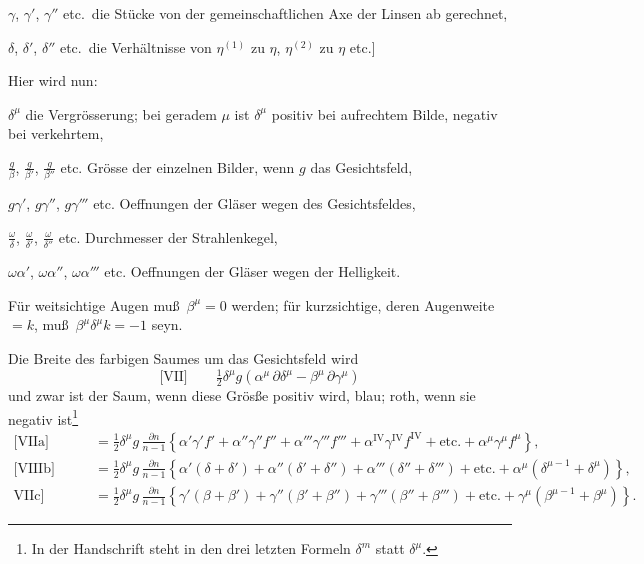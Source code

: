 \documentclass[12pt,a4paper]{article}
\theoremstyle{plain}
\theoremstyle{definition}
\theoremstyle{remark}
\begin{document}
$\gamma$, $\gamma'$, $\gamma''$ etc.\ die St\"ucke von der gemeinschaftlichen
Axe der Linsen ab gerechnet,

$\delta$, $\delta'$, $\delta''$ etc.\ die Verh\"altnisse von $\eta^{(1)}$ zu $\eta$,
$\eta^{(2)}$ zu $\eta$ etc.]

\medskip

Hier wird nun:

\quad $\delta^{\mu}$ die Vergr\"osserung; bei geradem $\mu$ ist
$\delta^{\mu}$ positiv bei aufrechtem Bilde, negativ bei verkehrtem,

\quad $\frac{g}{\beta}$, $\frac{g}{\beta'}$, $\frac{g}{\beta''}$ etc.\qquad
Gr\"osse der einzelnen Bilder, wenn $g$ das Gesichtsfeld,

\quad $g\gamma'$, $g\gamma''$, $g\gamma'''$ etc.\qquad
Oeffnungen der Gl\"aser wegen des Gesichtsfeldes,

\quad $\frac{\omega}{\delta}$, $\frac{\omega}{\delta'}$,
$\frac{\omega}{\delta''}$ etc.\qquad
Durchmesser der Strahlenkegel,

\quad $\omega\alpha'$, $\omega\alpha''$, $\omega\alpha'''$ etc.\qquad
Oeffnungen der Gl\"aser wegen der Helligkeit.

\medskip

F\"ur weitsichtige Augen mu\ss\ $\beta^{\mu} = 0$ werden; f\"ur
kurzsichtige, deren Augenweite $= k$, mu\ss\ $\beta^{\mu}\delta^{\mu}k = -1$
seyn.

Die Breite des farbigen Saumes um das Gesichtsfeld wird
\[
\text{[VII]}\qquad \tfrac{1}{2}\delta^{\mu}g\left(\alpha^{\mu}\,\partial\delta^{\mu}
- \beta^{\mu}\,\partial\gamma^{\mu}\right)
\]
und zwar ist der Saum, wenn diese Gr\"os\ss e positiv wird, blau; roth,
wenn sie negativ ist\footnote{In der Handschrift steht in den drei
letzten Formeln $\delta^{m}$ statt $\delta^{\mu}$.}
\begin{align*}
\text{[VIIa]}\qquad &= \tfrac{1}{2}\delta^{\mu}g\,\frac{\partial n}{n-1}
\left\{\alpha'\gamma'f' + \alpha''\gamma''f'' + \alpha'''\gamma'''f'''
+ \alpha^{\text{IV}}\gamma^{\text{IV}}f^{\text{IV}}
+ \text{etc.} + \alpha^{\mu}\gamma^{\mu}f^{\mu}\right\},\\
\text{[VIIIb]}\qquad &= \tfrac{1}{2}\delta^{\mu}g\,\frac{\partial n}{n-1}
\left\{\alpha'(\delta + \delta') + \alpha''(\delta' + \delta'')
+ \alpha'''(\delta'' + \delta''') + \text{etc.}
+ \alpha^{\mu}(\delta^{\mu-1} + \delta^{\mu})\right\},\\
\text{VIIc]}\qquad &= \tfrac{1}{2}\delta^{\mu}g\,\frac{\partial n}{n-1}
\left\{\gamma'(\beta + \beta') + \gamma''(\beta' + \beta'')
+ \gamma'''(\beta'' + \beta''') + \text{etc.}
+ \gamma^{\mu}(\beta^{\mu-1} + \beta^{\mu})\right\}.
\end{align*}
\end{document}
